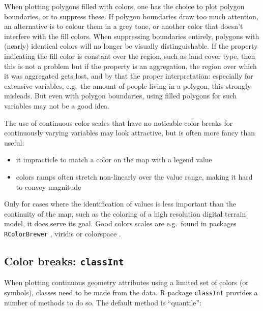 \documentclass[]{book}
\providecommand{\tightlist}{%
  \setlength{\itemsep}{0pt}\setlength{\parskip}{0pt}}
\begin{document}
When plotting polygons filled with colors, one has the choice to plot
polygon boundaries, or to suppress these. If polygon boundaries draw
too much attention, an alternative is to colour them in a grey tone,
or another color that doesn't interfere with the fill colors. When
suppressing boundaries entirely, polygons with (nearly) identical
colors will no longer be visually distinguishable. If the property
indicating the fill color is constant over the region, such as land
cover type, then this is not a problem but if the property is an
aggregation, the region over which it was aggregated gets lost,
and by that the proper interpretation: especially for extensive
variables, e.g.~the amount of people living in a polygon, this
strongly misleads. But even with polygon boundaries, using filled
polygons for such variables may not be a good idea.

The use of continuous color scales that have no noticable color
breaks for continuously varying variables may look attractive,
but is often more fancy than useful:

\begin{itemize}
\tightlist
\item
  it impracticle to match a color on the map with a legend value
\item
  colors ramps often stretch non-linearly over the value range,
  making it hard to convey magnitude
\end{itemize}

Only for cases where the identification of values is less
important than the continuity of the map, such as the coloring of
a high resolution digital terrain model, it does serve its goal.
Good colors scales are e.g.~found in packages \texttt{RColorBrewer}
\citep{R-RColorBrewer}, viridis \citep{R-viridis} or colorspace
\citep{R-colorspace, colorspace}.

\hypertarget{classintervals}{%
\subsection{\texorpdfstring{Color breaks: \texttt{classInt}}{Color breaks: classInt}}\label{classintervals}}

When plotting continuous geometry attributes using a limited set
of colors (or symbols), classes need to be made from the data.
R package \texttt{classInt} \citep{R-classInt} provides a number of methods to
do so. The default method is ``quantile'':
\end{document}
